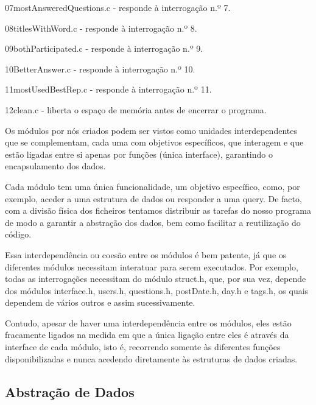 \documentclass[a4paper]{article}
\begin{document}
\begin{itemize}
\begin{item} 07mostAnsweredQuestions.c - responde à interrogação n.º 7.\end{item}
\begin{item} 08titlesWithWord.c - responde à interrogação n.º 8.\end{item}
\begin{item} 09bothParticipated.c - responde à interrogação n.º 9.\end{item}
\begin{item} 10BetterAnswer.c - responde à interrogação n.º 10.\end{item}
\begin{item} 11mostUsedBestRep.c - responde à interrogação n.º 11.\end{item}
\begin{item} 12clean.c - liberta o espaço de memória antes de encerrar o programa.\end{item}
\end{itemize}

Os módulos por nós criados podem ser vistos como unidades interdependentes que se
complementam, cada uma com objetivos específicos, que interagem e que estão ligadas
entre si apenas por funções (única interface), garantindo o encapsulamento dos dados.

Cada módulo tem uma única funcionalidade, um objetivo específico,
como, por exemplo, aceder a uma estrutura de dados ou responder a uma query.
De facto, com a divisão física dos ficheiros tentamos distribuir as
tarefas do nosso programa de modo a garantir a abstração dos dados, bem como
facilitar a reutilização do código.

Essa interdependência ou coesão entre os módulos é bem patente, já que
os diferentes módulos necessitam interatuar para serem executados. Por exemplo,
todas as interrogações necessitam do módulo struct.h, que, por sua vez, depende dos módulos
interface.h, users.h, questions.h, postDate.h, day.h e tags.h, os quais dependem de vários
outros e assim sucessivamente.

Contudo, apesar de haver uma interdependência entre os módulos, eles estão
fracamente ligados na medida em que a única ligação entre eles é através da interface de
cada módulo, isto é, recorrendo somente às diferentes funções disponibilizadas e
nunca acedendo diretamente às estruturas de dados criadas.


\subsection{Abstração de Dados}
\label{sec:abstracao}
\end{document}
